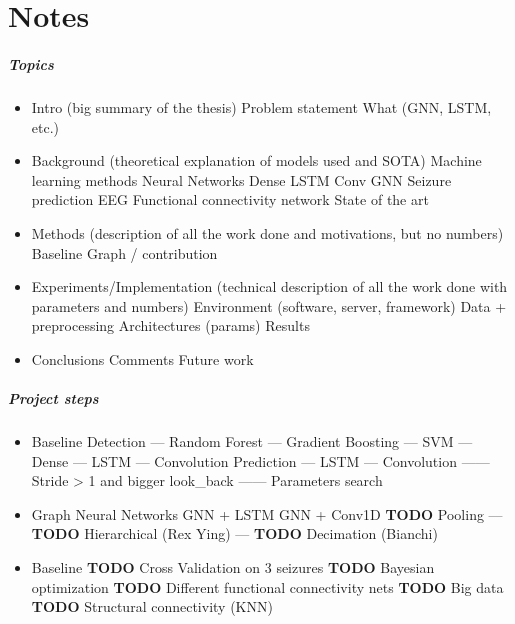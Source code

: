 
\chapter*{Notes}

\paragraph{Topics}
\begin{itemize}
    \item Intro (big summary of the thesis)
    \subitem Problem statement
    \subitem What (GNN, LSTM, etc.)
    \item Background (theoretical explanation of models used and SOTA)
    \subitem Machine learning methods
    \subitem Neural Networks
    \subitem Dense
    \subitem LSTM
    \subitem Conv
    \subitem GNN
    \subitem Seizure prediction
    \subitem EEG
    \subitem Functional connectivity network
    \subitem State of the art
    \item Methods (description of all the work done and motivations, but no numbers)
    \subitem Baseline
    \subitem Graph / contribution
    \item Experiments/Implementation (technical description of all the work done with parameters and numbers)
    \subitem Environment (software, server, framework)
    \subitem Data + preprocessing
    \subitem Architectures (params)
    \subitem Results
    \item Conclusions
    \subitem Comments
    \subitem Future work
\end{itemize}

\paragraph{Project steps}
\begin{itemize}
    \item Baseline
    \subitem Detection
    \subitem --- Random Forest
    \subitem --- Gradient Boosting
    \subitem --- SVM
    \subitem --- Dense
    \subitem --- LSTM
    \subitem --- Convolution
    \subitem Prediction
    \subitem --- LSTM
    \subitem --- Convolution
    \subitem ------ Stride > 1 and bigger look\_back
    \subitem ------ Parameters search
    \item Graph Neural Networks
    \subitem GNN + LSTM
    \subitem GNN + Conv1D
    \subitem \textbf{TODO} Pooling
    \subitem --- \textbf{TODO} Hierarchical (Rex Ying)
    \subitem --- \textbf{TODO} Decimation (Bianchi)
    \item Baseline
    \subitem \textbf{TODO} Cross Validation on 3 seizures
    \subitem \textbf{TODO} Bayesian optimization
    \subitem \textbf{TODO} Different functional connectivity nets
    \subitem \textbf{TODO} Big data
    \subitem \textbf{TODO} Structural connectivity (KNN)
\end{itemize}

